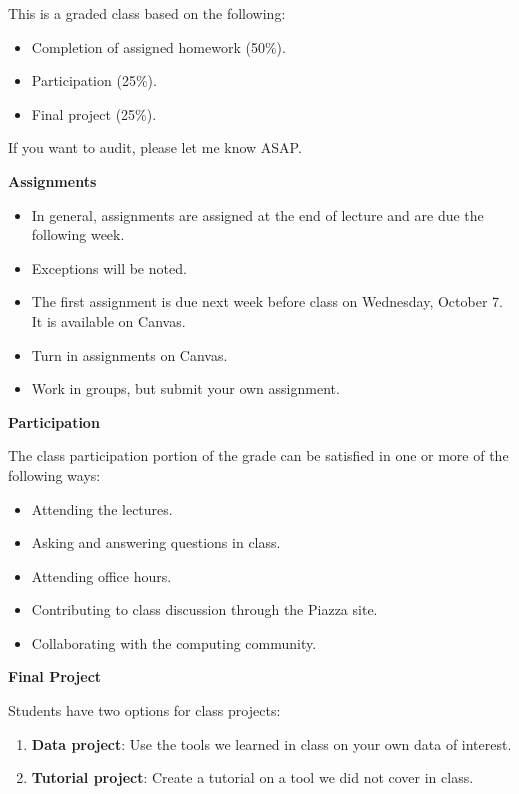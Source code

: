 \documentclass[
]{book}
\providecommand{\tightlist}{%
  \setlength{\itemsep}{0pt}\setlength{\parskip}{0pt}}
\begin{document}
This is a graded class based on the following:

\begin{itemize}
\tightlist
\item
  Completion of assigned homework (50\%).
\item
  Participation (25\%).
\item
  Final project (25\%).
\end{itemize}

If you want to audit, please let me know ASAP.

\textbf{Assignments}

\begin{itemize}
\tightlist
\item
  In general, assignments are assigned at the end of lecture and are due the following week.
\item
  Exceptions will be noted.
\item
  The first assignment is due next week before class on Wednesday, October 7. It is available on Canvas.
\item
  Turn in assignments on Canvas.
\item
  Work in groups, but submit your own assignment.
\end{itemize}

\textbf{Participation}

The class participation portion of the grade can be satisfied in one or more of the following ways:

\begin{itemize}
\tightlist
\item
  Attending the lectures.
\item
  Asking and answering questions in class.
\item
  Attending office hours.
\item
  Contributing to class discussion through the Piazza site.
\item
  Collaborating with the computing community.
\end{itemize}

\textbf{Final Project}

Students have two options for class projects:

\begin{enumerate}
\def\labelenumi{\arabic{enumi}.}
\item
  \textbf{Data project}: Use the tools we learned in class on your own data of interest.
\item
  \textbf{Tutorial project}: Create a tutorial on a tool we did not cover in class.
\end{enumerate}
\end{document}
